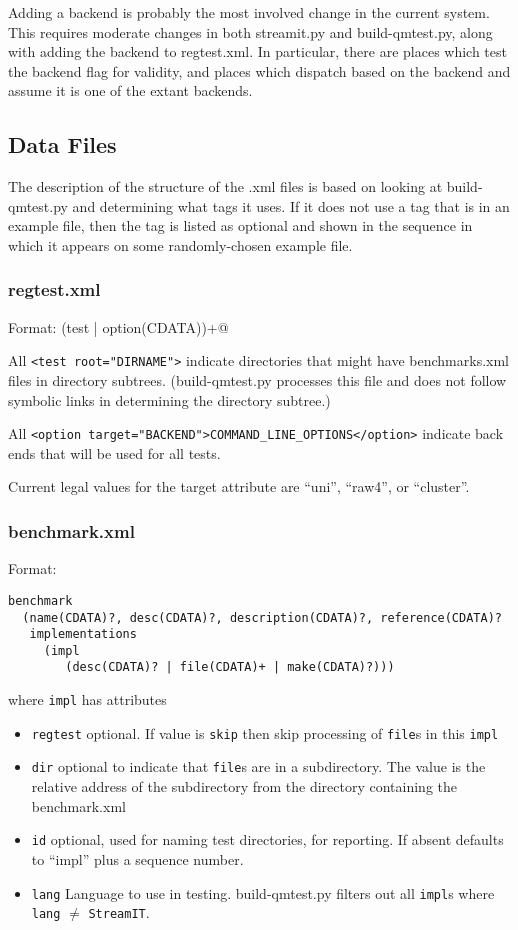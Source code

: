 \documentclass[11pt]{article}
\begin{document}
Adding a backend is probably the most involved change in the current
system.  This requires moderate changes in both \textsf{streamit.py}
and \textsf{build-qmtest.py}, along with adding the backend to
\textsf{regtest.xml}.  In particular, there are places which test the
backend flag for validity, and places which dispatch based on the
backend and assume it is one of the extant backends.

\subsection{Data Files}
The description of the structure of the .xml files is based on looking
at build-qmtest.py and determining what tags it uses.  If it does not
use a tag that is in an example file, then the tag is listed as
optional and shown in the sequence in which it appears on some
randomly-chosen example file.

\subsubsection{regtest.xml}
Format: \verb@regtest (test | option(CDATA))+@

All \verb+<test root="DIRNAME">+ indicate directories that might have 
benchmarks.xml files in directory subtrees. (build-qmtest.py processes
this file and does not follow symbolic links in determining the
directory subtree.)

All \verb+<option target="BACKEND">COMMAND_LINE_OPTIONS</option>+
indicate back ends that will be used for all tests.

Current legal values for the target attribute are  ``uni'', ``raw4'', or 
``cluster''.

\subsubsection{benchmark.xml}
Format:\begin{verbatim}
benchmark 
  (name(CDATA)?, desc(CDATA)?, description(CDATA)?, reference(CDATA)?
   implementations 
     (impl
        (desc(CDATA)? | file(CDATA)+ | make(CDATA)?)))
       \end{verbatim}%
where {\tt impl} has attributes
\begin{itemize}
\item {\tt regtest} optional.  If value is {\tt skip} then skip
  processing of {\tt file}s in this {\tt impl} 
\item {\tt dir} optional to indicate that {\tt file}s are in a subdirectory.
The value is the relative address of the subdirectory from the
directory containing the benchmark.xml
\item {\tt id} optional, used for naming test directories, for
  reporting.  If absent defaults to ``impl'' plus a sequence number.
\item {\tt lang} Language to use in testing.  build-qmtest.py filters
  out all {\tt impl}s where {\tt lang} $\neq$ {\tt StreamIT}.
\end{itemize}
\end{document}
